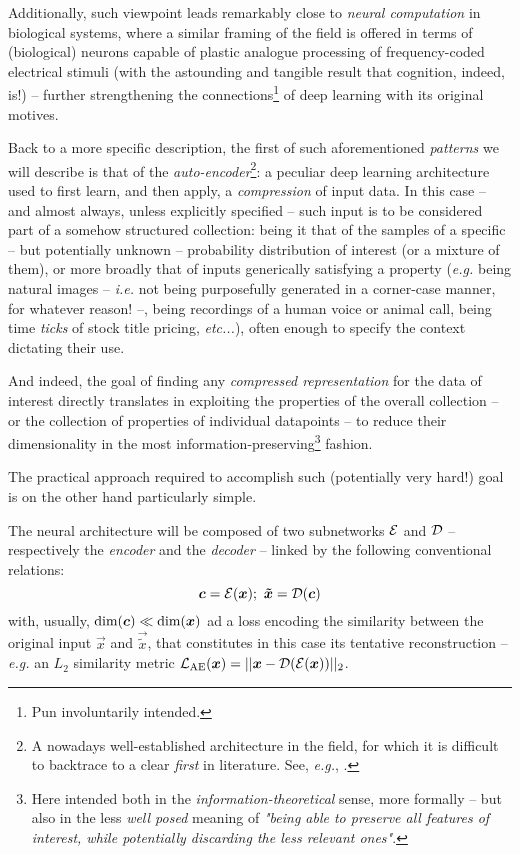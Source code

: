 Additionally, such viewpoint leads remarkably close to \textit{neural computation} in biological systems, where a similar framing of the field is offered in terms of (biological) neurons capable of plastic analogue processing of frequency-coded electrical stimuli (with the astounding and tangible result that cognition, indeed, is!) -- further strengthening the connections\footnote{Pun involuntarily intended.} of deep learning with its original motives.

Back to a more specific description, the first of such aforementioned \textit{patterns} we will describe is that of the \textit{auto-encoder}\footnote{A nowadays well-established architecture in the field, for which it is difficult to backtrace to a clear \textit{first} in literature. See, \textit{e.g.}, \cite{Kramer1991Autoencoders}.}: a peculiar deep learning architecture used to first learn, and then apply, a \textit{compression} of input data. In this case -- and almost always, unless explicitly specified -- such input is to be considered part of a somehow structured collection: being it that of the samples of a specific -- but potentially unknown -- probability distribution of interest (or a mixture of them), or more broadly that of inputs generically satisfying a property (\textit{e.g.} being natural images -- \textit{i.e.} not being purposefully generated in a corner-case manner, for whatever reason! --, being recordings of a human voice or animal call, being time \textit{ticks} of stock title pricing, \textit{etc...}), often enough to specify the context dictating their use.

And indeed, the goal of finding any \textit{compressed representation} for the data of interest directly translates in exploiting the properties of the overall collection -- or the collection of properties of individual datapoints -- to reduce their dimensionality in the most information-preserving\footnote{Here intended both in the \textit{information-theoretical} sense, more formally -- but also in the less \textit{well posed} meaning of \textit{"being able to preserve all features of interest, while potentially discarding the less relevant ones"}.} fashion.

The practical approach required to accomplish such (potentially very hard!) goal is on the other hand particularly simple.

The neural architecture will be composed of two subnetworks $\mathcal{E}$ and $\mathcal{D}$ -- respectively the \textit{encoder} and the \textit{decoder} -- linked by the following conventional relations:
$$\bm{c} = \mathcal{E}(\bm{x}); \
\bm{\tilde{x}} = \mathcal{D}(\bm{c})$$
with, usually, $\text{dim}(\bm{c}) \ll \text{dim}(\bm{x})$ ad a loss encoding the similarity between the original input $\vec{x}$ and $\vec{\tilde{x}}$, that constitutes in this case its tentative reconstruction -- \textit{e.g.} an $L_2$ similarity metric \suchthat $\mathcal{L}_{\text{AE}}(\bm{x}) = ||\bm{x} - \mathcal{D}(\mathcal{E}(\bm{x}))||_2$.

